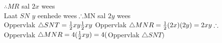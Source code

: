 \begin{eocsolutions}{}
{\begin{enumerate}[itemsep=5pt, label=\textbf{\arabic*}. ]
\begin{enumerate}[noitemsep, label=\textbf{(\alph*)} ]
$\therefore MR$ sal $2x$ wees\\
Laat $SN$ $y$ eenhede wees$\\
\therefore $MN sal $2y$ wees\\
Oppervlak $\triangle SNT = \frac{1}{2}xy\\
\frac{1}{2} xy\\$
Oppervlak $\triangle MNR = \frac{1}{2} (2x)(2y)\\
=2xy\\
\therefore$ Oppervlak $ \triangle MNR = 4(\frac{1}{2}xy)\\
=4($Oppervlak $\triangle SNT)$
\end{enumerate}
\end{enumerate}}
\end{eocsolutions}


